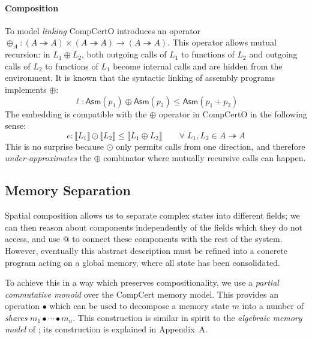 \documentclass[acmsmall,screen,review,anonymous,nonacm]{acmart}
\newcommand{\kw}[1]{\ensuremath{ \mathsf{#1} }}
\begin{document}
\paragraph{Composition}
To model \textit{linking}
CompCertO introduces
an operator
$\oplus_A : (A \twoheadrightarrow A) \times (A \twoheadrightarrow A) \rightarrow (A \twoheadrightarrow A)$.
This operator allows
mutual recursion:
in $L_1 \oplus L_2$,
both outgoing calls of $L_1$ to functions of $L_2$
and outgoing calls of $L_2$ to functions of $L_1$
become internal calls
and are hidden from the environment.
It is known that
the syntactic linking
of assembly programs
implements $\oplus$:
\[
  \ell :
  \kw{Asm}(p_1) \oplus \kw{Asm}(p_2) \le
  \kw{Asm}(p_1 + p_2)
\]%
The embedding is compatible
with the $\oplus$ operator in CompCertO
in the following sense:
\[
  \mathit{e}: \llbracket L_1 \rrbracket \odot \llbracket L_2 \rrbracket
    \le  \llbracket L_1 \oplus L_2 \rrbracket
  \qquad \forall \; L_1, L_2 \in A \twoheadrightarrow A
\]
This is no surprise because
$\odot$ only permits calls
from one direction,
and therefore \emph{under-approximates}
the $\oplus$ combinator
where mutually recursive calls can happen.

\subsection{Memory Separation}
\label{sec:application:sepalg} %

Spatial composition
allows us to separate
complex states into different fields;
we can then reason about components
independently of the fields which they do not access,
and use $\mathbin@$
to connect these components with the rest of the system.
However, eventually this abstract description
must be refined into a concrete program
acting on a global memory,
where all state has been consolidated.

To achieve this in a way which preserves compositionality,
we use a \emph{partial commutative monoid}
over the CompCert memory model.
This provides an operation $\bullet$
which can be used to decompose a memory state $m$ into
a number of \emph{shares}
$
  m_1 \bullet \cdots \bullet m_n
$.
This construction
is similar in spirit to the \emph{algebraic memory model}
of \citet{ccal};
its construction is explained in Appendix~A. %
\end{document}
